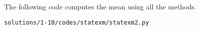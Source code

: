 %	
%	
The following code computes the mean using all the methods.
\begin{lstlisting}
solutions/1-10/codes/statexm/statexm2.py
\end{lstlisting}
